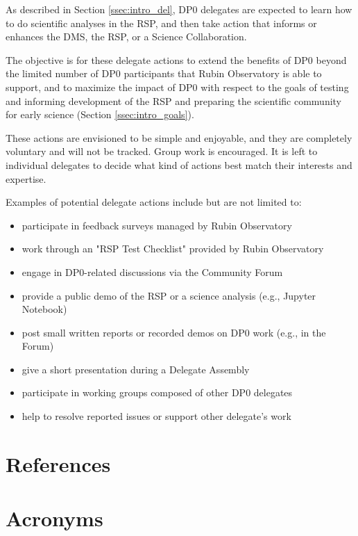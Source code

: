 \documentclass[DM,lsstdraft,authoryear,toc]{lsstdoc}
\begin{document}
As described in Section \ref{ssec:intro_del}, DP0 delegates are expected to learn how to do scientific analyses in the RSP, and then take action that informs or enhances the DMS, the RSP, or a Science Collaboration. 

The objective is for these delegate actions to extend the benefits of DP0 beyond the limited number of DP0 participants that Rubin Observatory is able to support, and to maximize the impact of DP0 with respect to the goals of testing and informing development of the RSP and preparing the scientific community for early science (Section \ref{ssec:intro_goals}). 

These actions are envisioned to be simple and enjoyable, and they are completely voluntary and will not be tracked.
Group work is encouraged.
It is left to individual delegates to decide what kind of actions best match their interests and expertise. 

Examples of potential delegate actions include but are not limited to:
\begin{itemize}
\item participate in feedback surveys managed by Rubin Observatory
\item work through an "RSP Test Checklist" provided by Rubin Observatory
\item engage in DP0-related discussions via the Community Forum
\item provide a public demo of the RSP or a science analysis (e.g., Jupyter Notebook)
\item post small written reports or recorded demos on DP0 work (e.g., in the Forum)
\item give a short presentation during a Delegate Assembly
\item participate in working groups composed of other DP0 delegates
\item help to resolve reported issues or support other delegate's work
\end{itemize}


\appendix
\section{References} \label{sec:bib}
\renewcommand{\refname}{} %


\section{Acronyms}



% 
\end{document}
